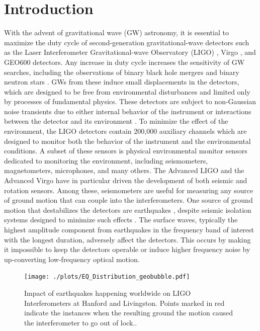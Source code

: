 \documentclass[twocolumn, aps, superscriptaddress]{revtex4}
\begin{document}
\section{Introduction}
With the advent of gravitational wave (GW) astronomy, it is essential to maximize the duty cycle of second-generation gravitational-wave detectors such as the Laser Interferometer Gravitational-wave Observatory (LIGO) \cite{aligo}, Virgo \cite{avirgo}, and GEO600 \cite{Gr2010} detectors.
Any increase in duty cycle increases the sensitivity of GW searches, including the observations of binary black hole mergers \cite{AbEA2016a,AbEA2016e,AbEA2017a,AbEA2017c} and binary neutron stars \cite{AbEA2017b}. GWs from these induce small displacements in the detectors, which are designed to be free from environmental disturbances and limited only by processes of fundamental physics.
These detectors are subject to non-Gaussian noise transients due to either internal behavior of the instrument or interactions between the detector and its environment \cite{AbEA2016f}. To minimize the effect of the environment, the LIGO detectors contain 200,000 auxiliary channels which are designed to monitor both the behavior of the instrument and the environmental conditions.
A subset of these sensors is physical environmental monitor sensors dedicated to monitoring the environment, including seismometers, magnetometers, microphones, and many others.  The Advanced LIGO \cite{aligo} and the Advanced Virgo \cite{avirgo} have in particular driven the development of both seismic \cite{BeCa2016} and rotation \cite{VeHa2014} sensors. Among these, seismometers are useful for measuring any source of ground motion that can couple into the interferometers. One source of ground motion that destabilizes the detectors are earthquakes
\cite{CoSt2015,CoEa2017}, despite seismic isolation systems designed to minimize such effects \cite{AbAd2002,StAb2009,MaLa2015}.
The surface waves, typically the highest amplitude component from earthquakes in the frequency band of interest with the longest duration, adversely affect the detectors. 
This occurs by making it impossible to keep the detectors operable or induce higher frequency noise by up-converting low-frequency optical motion.

\begin{figure}[!htb]
  \texttt{[image: ./plots/EQ\_Distribution\_geobubble.pdf]}
 \caption{Impact of earthquakes happening worldwide on LIGO Interferometers at Hanford
and Livingston. Points marked in red indicate the instances when the resulting ground
the motion caused the interferometer to go out of lock..}
 \label{fig:eq_worldwide}
\end{figure}
\end{document}
